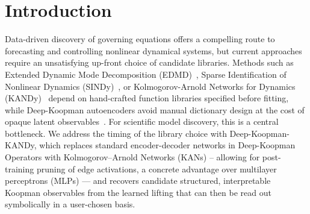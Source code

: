 \documentclass{article}
\begin{document}

 

\section*{Introduction}

Data-driven discovery of governing equations offers a compelling route to forecasting and controlling nonlinear dynamical systems, but current approaches require an unsatisfying up-front choice of candidate libraries. Methods such as Extended Dynamic Mode Decomposition (EDMD)~\cite{Williams2014, williams2016kernel}, Sparse Identification of Nonlinear Dynamics (SINDy)~\cite{sindy}, or Kolmogorov-Arnold Networks for Dynamics (KANDy)~\cite{kandy} depend on hand-crafted function libraries specified before fitting, while Deep-Koopman autoencoders avoid manual dictionary design at the cost of opaque latent observables~\cite{sindy_ae, lusch2018, li2017, otto2019}. For scientific model discovery, this is a central bottleneck. We address the timing of the library choice with Deep-Koopman-KANDy, which replaces standard encoder-decoder networks in Deep-Koopman Operators with Kolmogorov–Arnold Networks (KANs) -- allowing for post-training pruning of edge activations, a concrete advantage over multilayer perceptrons (MLPs) --- and recovers candidate structured, interpretable Koopman observables from the learned lifting that can then be read out symbolically in a user-chosen basis.
 
\end{document}
